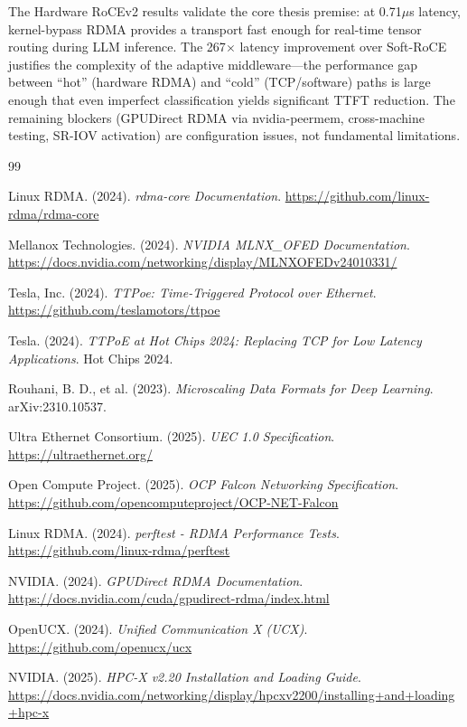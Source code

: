 \documentclass[10pt,letterpaper]{article}
\begin{document}
The Hardware RoCEv2 results validate the core thesis premise: at 0.71$\mu$s latency, kernel-bypass RDMA provides a transport fast enough for real-time tensor routing during LLM inference. The 267$\times$ latency improvement over Soft-RoCE justifies the complexity of the adaptive middleware---the performance gap between ``hot'' (hardware RDMA) and ``cold'' (TCP/software) paths is large enough that even imperfect classification yields significant TTFT reduction. The remaining blockers (GPUDirect RDMA via nvidia-peermem, cross-machine testing, SR-IOV activation) are configuration issues, not fundamental limitations.

\begin{thebibliography}{99}

Linux RDMA. (2024). \textit{rdma-core Documentation}. \url{https://github.com/linux-rdma/rdma-core}

Mellanox Technologies. (2024). \textit{NVIDIA MLNX\_OFED Documentation}. \url{https://docs.nvidia.com/networking/display/MLNXOFEDv24010331/}

Tesla, Inc. (2024). \textit{TTPoe: Time-Triggered Protocol over Ethernet}. \url{https://github.com/teslamotors/ttpoe}

Tesla. (2024). \textit{TTPoE at Hot Chips 2024: Replacing TCP for Low Latency Applications}. Hot Chips 2024.

Rouhani, B. D., et al. (2023). \textit{Microscaling Data Formats for Deep Learning}. arXiv:2310.10537.

Ultra Ethernet Consortium. (2025). \textit{UEC 1.0 Specification}. \url{https://ultraethernet.org/}

Open Compute Project. (2025). \textit{OCP Falcon Networking Specification}. \url{https://github.com/opencomputeproject/OCP-NET-Falcon}

Linux RDMA. (2024). \textit{perftest - RDMA Performance Tests}. \url{https://github.com/linux-rdma/perftest}

NVIDIA. (2024). \textit{GPUDirect RDMA Documentation}. \url{https://docs.nvidia.com/cuda/gpudirect-rdma/index.html}

OpenUCX. (2024). \textit{Unified Communication X (UCX)}. \url{https://github.com/openucx/ucx}

NVIDIA. (2025). \textit{HPC-X v2.20 Installation and Loading Guide}. \url{https://docs.nvidia.com/networking/display/hpcxv2200/installing+and+loading+hpc-x}


\end{thebibliography}
\end{document}

